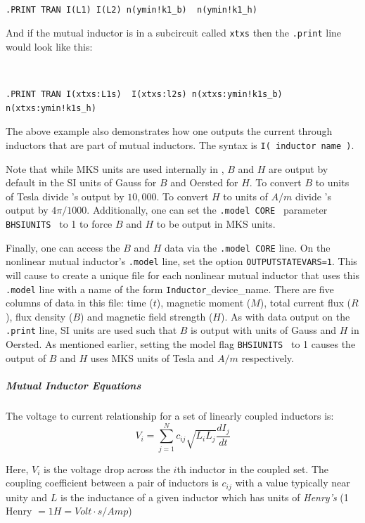 {\tt 
\begin{verbatim}
.PRINT TRAN I(L1) I(L2) n(ymin!k1_b)  n(ymin!k1_h)  
\end{verbatim}
}

And if the mutual inductor is in a subcircuit called {\tt xtxs} then the 
{\tt .print} line would look like this:

{\tt 
\begin{verbatim}
.PRINT TRAN I(xtxs:L1s)  I(xtxs:l2s) n(xtxs:ymin!k1s_b) n(xtxs:ymin!k1s_h)
\end{verbatim}
}

The above example also demonstrates how one outputs the current through inductors 
that are part of mutual inductors.  
The syntax is {\tt I( inductor name )}.

Note that while MKS units are used internally in \Xyce{}, $B$ and $H$ are output
by default in the SI units of Gauss for $B$ and Oersted for $H$.
To convert $B$ to units of Tesla divide  \Xyce{}'s output by $10,000$.  
To convert $H$ to units of $A/m$ divide  \Xyce{}'s output by $4\pi/1000$. 
Additionally, one can set the {\tt .model CORE }
parameter {\tt BHSIUNITS } to 1 to force $B$ and $H$ to be output in MKS
units. 


Finally, one can access the $B$ and $H$ data via the {\tt .model
CORE} line. On the nonlinear mutual inductor's {\tt .model} line, set the
option {\tt OUTPUTSTATEVARS=1}. This will cause \Xyce{} to create a unique
file for each nonlinear mutual inductor that uses this {\tt .model} line
with a name of the form {\tt Inductor\_}device\_name.  There are five
columns of data in this file: time ($t$), magnetic moment ($M$), total
current flux ($R$), flux density ($B$) and magnetic field strength
($H$).  As with data output on the {\tt .print} line, SI units are used
such that $B$ is output with units of Gauss and $H$ in Oersted.  As
mentioned earlier, setting the model flag {\tt BHSIUNITS } to 1 causes
the output of $B$ and $H$ uses MKS units of Tesla and $A/m$
respectively. 

\subparagraph{Mutual Inductor Equations}

The voltage to current relationship for a set of linearly coupled inductors is:
\begin{equation}
V_{i} = \sum_{j=1}^{N} c_{ij} \sqrt{ L_{i} L_{j} } \frac{dI_{j}}{dt}
\label{linMIRelation}
\end{equation}

Here, $V_{i}$ is the voltage drop across the $i$th inductor in the coupled set.
The coupling coefficient between a pair of inductors is $c_{ij}$ with a value typically
near unity and $L$ is the inductance of a given inductor which has units of
\emph{Henry's} (1 Henry $ = 1 H = Volt \cdot s / Amp $)

